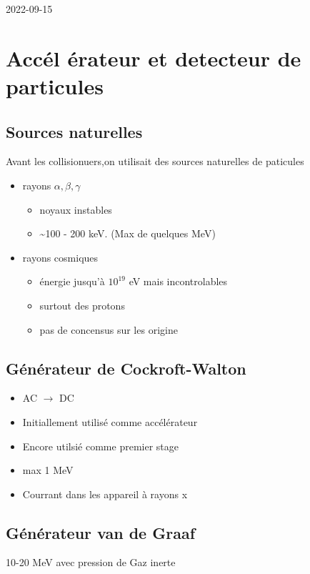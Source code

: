 


2022-09-15
\section*{Accél érateur et detecteur de particules}

\subsection*{Sources naturelles}

Avant les collisionuers,on utilisait des sources naturelles de paticules

\begin{itemize}
	\item rayons $\alpha,\beta,\gamma$ 
		\begin{itemize}
			\item noyaux instables
			\item \sim 100 - 200 keV. (Max de quelques MeV)
		\end{itemize}
	\item rayons cosmiques
		\begin{itemize}
			\item énergie jusqu'à $10^{19}$ eV mais incontrolables
			\item surtout des protons
			\item pas de concensus sur les origine
		\end{itemize}
\end{itemize}

\subsection*{Générateur de Cockroft-Walton}
	\begin{itemize}
		\item AC $\to$ DC
		\item Initiallement utilisé comme accélérateur 
		\item  Encore utilsié comme premier stage
		\item max 1 MeV
		\item Courrant dans les appareil à rayons x
	\end{itemize}

\subsection*{Générateur van de Graaf}

10-20 MeV avec pression de Gaz inerte

